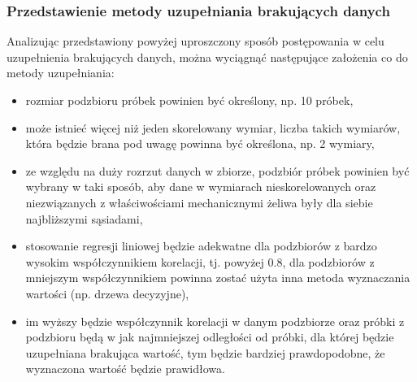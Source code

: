 \subsubsection{Przedstawienie metody uzupełniania brakujących danych}
Analizując przedstawiony powyżej uproszczony sposób postępowania w celu uzupełnienia brakujących danych, można wyciągnąć następujące założenia co do metody uzupełniania:
\begin{itemize}
    \item rozmiar podzbioru próbek powinien być określony, np. 10 próbek,
    \item może istnieć więcej niż jeden skorelowany wymiar, liczba takich wymiarów, która będzie brana pod uwagę powinna być określona, np. 2 wymiary,
    \item ze względu na duży rozrzut danych w zbiorze, podzbiór próbek powinien być wybrany w taki sposób, aby dane w wymiarach nieskorelowanych oraz niezwiązanych z właściwościami mechanicznymi żeliwa były dla siebie najbliższymi sąsiadami, 
    \item stosowanie regresji liniowej będzie adekwatne dla podzbiorów z bardzo wysokim współczynnikiem korelacji, tj. powyżej 0.8, dla podzbiorów z mniejszym współczynnikiem powinna zostać użyta inna metoda wyznaczania wartości (np. drzewa decyzyjne),
    \item im wyższy będzie współczynnik korelacji w danym podzbiorze oraz próbki z podzbioru będą w jak najmniejszej odległości od próbki, dla której będzie uzupełniana brakująca wartość, tym będzie bardziej prawdopodobne, że wyznaczona wartość będzie prawidłowa.
\end{itemize}

